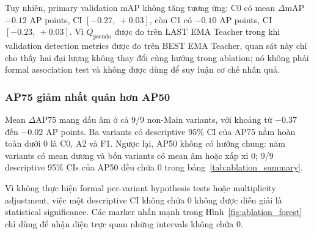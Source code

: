 \documentclass[pdflatex,sn-mathphys-num]{sn-jnl}%
\theoremstyle{thmstyleone}%
\theoremstyle{thmstyletwo}%
\theoremstyle{thmstylethree}%
\begin{document}
Tuy nhiên, primary validation mAP không tăng tương ứng: C0 có mean $\Delta$mAP $-0.12$ AP points, CI $[-0.27,\ +0.03]$, còn C1 có $-0.10$ AP points, CI $[-0.23,\ +0.03]$. Vì $Q_{\mathrm{pseudo}}$ được đo trên LAST EMA Teacher trong khi validation detection metrics được đo trên BEST EMA Teacher, quan sát này chỉ cho thấy hai đại lượng không thay đổi cùng hướng trong ablation; nó không phải formal association test và không được dùng để suy luận cơ chế nhân quả.

\subsubsection{AP75 giảm nhất quán hơn AP50}

Mean $\Delta$AP75 mang dấu âm ở cả 9/9 non-Main variants, với khoảng từ $-0.37$ đến $-0.02$ AP points. Ba variants có descriptive 95\% CI của AP75 nằm hoàn toàn dưới 0 là C0, A2 và F1. Ngược lại, AP50 không có hướng chung: năm variants có mean dương và bốn variants có mean âm hoặc xấp xỉ 0; 9/9 descriptive 95\% CIs của AP50 đều chứa 0 trong  bảng~\ref{tab:ablation_summary}.

Vì không thực hiện formal per-variant hypothesis tests hoặc multiplicity adjustment, việc một descriptive CI không chứa 0 không được diễn giải là statistical significance. Các marker nhấn mạnh trong Hình~\ref{fig:ablation_forest} chỉ dùng để nhận diện trực quan những intervals không chứa 0.
\end{document}
